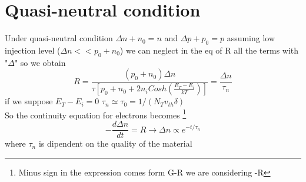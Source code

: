 \section{Quasi-neutral condition}

Under quasi-neutral condition $\Delta n +n_0=n$ and $\Delta p +p_0=p$ assuming low injection level ($\Delta n<<p_0+n_0$) we can neglect in the eq of R all the terms with "$\Delta$" so we obtain
\begin{equation}
R=\frac{(p_0+n_0)\Delta n}{\tau\left[p_0+n_0+2n_iCosh(\frac{E_T-E_i}{kT})\right]}=\frac{\Delta n}{\tau_n}
\end{equation}
if we suppose $E_T-E_i=0$ $\tau_n\simeq \tau_0=1/(N_Tv_{th}\delta)$\\
So the continuity equation for electrons becomes \footnote{Minus sign in the expression comes form G-R we are considering -R}
\begin{equation}
-\frac{d\Delta n}{dt}=R \rightarrow \Delta n \propto e^{-t/\tau_n}
\end{equation} 
where $\tau_n$ is dipendent on the quality of the material

